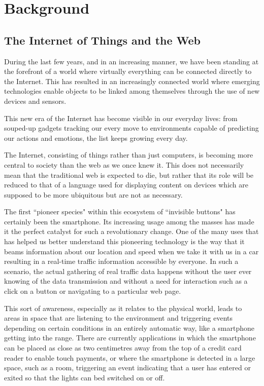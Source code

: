 \chead{}
\chapter{Background}

\section{The Internet of Things and the Web}
\label{section:iot}
During the last few years, and in an increasing manner, we have been standing at the forefront of a world where virtually everything can be connected directly to the Internet. This has resulted in an increasingly connected world where emerging technologies enable objects to be linked among themselves through the use of new devices and sensors.

This new era of the Internet has become visible in our everyday lives: from souped-up gadgets tracking our every move to environments capable of predicting our actions and emotions, the list keeps growing every day.

The Internet, consisting of things rather than just computers, is becoming more central to society than the web as we once knew it. This does not necessarily mean that the traditional web is expected to die, but rather that its role will be reduced to that of a language used for displaying content on devices which are supposed to be more ubiquitous but are not as necessary.

The first ``pioneer species" within this ecosystem of ``invisible buttons" has certainly been the smartphone. Its increasing usage among the masses has made it the perfect catalyst for such a revolutionary change. One of the many uses that has helped us better understand this pioneering technology is the way that it beams information about our location and speed when we take it with us in a car resulting in a real-time traffic information accessible by everyone. In such a scenario, the actual gathering of real traffic data happens without the user ever knowing of the data transmission and without a need for interaction such as a click on a button or navigating to a particular web page.

This sort of awareness, especially as it relates to the physical world, leads to areas in space that are listening to the environment and triggering events depending on certain conditions in an entirely automatic way, like a smartphone getting into the range. There are currently applications in which the smartphone can be placed as close as two centimetres away from the top of a credit card reader to enable touch payments, or where the smartphone is detected in a large space, such as a room, triggering an event indicating that a user has entered or exited so that the lights can bed switched on or off.

